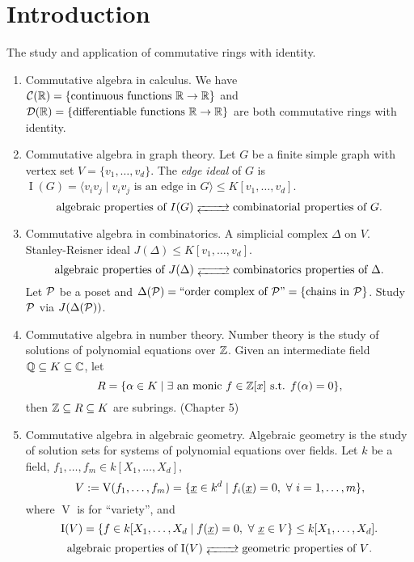 \chapter*{Introduction}


The study and application of commutative rings with identity.
    \begin{enumerate}
        \item Commutative algebra in calculus. We have $\mathcal{C}(\mathbb{R}) = \{\text{continuous functions }\mathbb{R} \to \mathbb{R}\}$ and $\mathcal{D}(\mathbb{R}) = \{\text{differentiable functions }\mathbb{R} \to \mathbb{R}\}$ are both commutative rings with identity.
        \item Commutative algebra in graph theory. Let $G$ be a finite simple graph with vertex set $V = \{v_1,\ldots,v_d\}$. The \emph{edge ideal} of $G$ is $\operatorname{I}(G) = \langle v_iv_j \mid v_iv_j \text{ is an edge in }G \rangle \leq K[v_1,\ldots,v_d]$. 
            \[\text{algebraic properties of $I(G)$} \myrightleftarrows{\rule{0.8cm}{0cm}} \text{combinatorial properties of $G$}.\]
        \item Commutative algebra in combinatorics.  A simplicial complex $\Delta$ on $V$. Stanley-Reisner ideal $J(\Delta) \leq K[v_1,\ldots,v_d]$. 
            \[\text{algebraic properties of $J(\Delta)$} \myrightleftarrows{\rule{0.8cm}{0cm}} \text{combinatorics properties of $\Delta$}.\]
            Let $\mathcal{P}$ be a poset and $\Delta(\mathcal{P}) = ``\text{order complex of $\mathcal{P}$''} = \{\text{chains in $\mathcal{P}$}\}$. Study $\mathcal{P}$ via $J(\Delta(\mathcal{P}))$. 
        \item Commutative algebra in number theory. Number theory is the study of solutions of polynomial equations over $\mathbb{Z}$. Given an intermediate field $\mathbb{Q} \subseteq K \subseteq \mathbb{C}$, let 
            \[R = \{\alpha \in K \mid \exists \  \text{an monic }f \in \mathbb{Z}[x] \text{ s.t. } f(\alpha) = 0\},\] 
            then $\mathbb{Z} \subseteq R \subseteq K$ are subrings. (Chapter 5)
        \item Commutative algebra in algebraic geometry. Algebraic geometry is the study of solution sets for systems of polynomial equations over fields. Let $k$ be a field, $f_1,\ldots,f_m \in k[X_1,\ldots,X_d]$, 
            \[V := \operatorname{V}(f_1,\ldots,f_m) = \{\underline x \in k^d \mid f_i(\underline x) = 0,\ \forall \  i = 1,\ldots,m\},\] 
            where $\operatorname{V}$ is for ``variety'', and 
            \[\operatorname{I}(V) = \{f \in k[X_1,\ldots,X_d \mid f(\underline x) = 0,\ \forall \  \underline x \in V\} \leq k[X_1,\ldots,X_d].\] 
            \[\text{algebraic properties of $\operatorname{I}(V)$} \myrightleftarrows{\rule{0.8cm}{0cm}} \text{geometric properties of $V$}.\]
    \end{enumerate}

